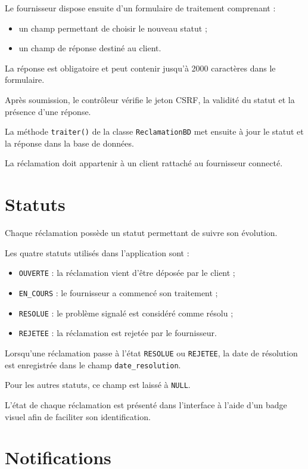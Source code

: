 Le fournisseur dispose ensuite d'un formulaire de traitement comprenant :
\begin{itemize}
    \item un champ permettant de choisir le nouveau statut ;
    \item un champ de réponse destiné au client.
\end{itemize}

La réponse est obligatoire et peut contenir jusqu'à 2000 caractères dans le formulaire.

Après soumission, le contrôleur vérifie le jeton CSRF, la validité du statut et la présence d'une réponse.

La méthode \texttt{traiter()} de la classe \texttt{ReclamationBD} met ensuite à jour le statut et la réponse dans la base de données.

La réclamation doit appartenir à un client rattaché au fournisseur connecté.

\section{Statuts}

Chaque réclamation possède un statut permettant de suivre son évolution.

Les quatre statuts utilisés dans l'application sont :
\begin{itemize}
    \item \texttt{OUVERTE} : la réclamation vient d'être déposée par le client ;
    \item \texttt{EN\_COURS} : le fournisseur a commencé son traitement ;
    \item \texttt{RESOLUE} : le problème signalé est considéré comme résolu ;
    \item \texttt{REJETEE} : la réclamation est rejetée par le fournisseur.
\end{itemize}

Lorsqu'une réclamation passe à l'état \texttt{RESOLUE} ou \texttt{REJETEE}, la date de résolution est enregistrée dans le champ \texttt{date\_resolution}.

Pour les autres statuts, ce champ est laissé à \texttt{NULL}.

L'état de chaque réclamation est présenté dans l'interface à l'aide d'un badge visuel afin de faciliter son identification.

\section{Notifications}

